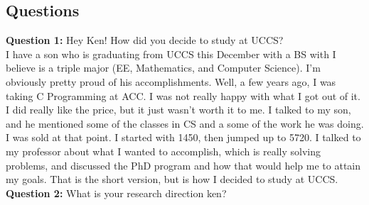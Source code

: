 \subsection{Questions}
\textbf{Question 1:} Hey Ken! How did you decide to study at UCCS?\\
I have a son who is graduating from UCCS this December with a BS with I believe is a triple major (EE, Mathematics, and Computer Science).  I'm obviously pretty proud of his accomplishments.  Well, a few years ago, I was taking C Programming at ACC.  I was not really happy with what I got out of it.  I did really like the price, but it just wasn't worth it to me.  I talked to my son, and he mentioned some of the classes in CS and a some of the work he was doing.  I was sold at that point.  I started with 1450, then jumped up to 5720.  I talked to my professor about what I wanted to accomplish, which is really solving problems, and discussed the PhD program and how that would help me to attain my goals.  That is the short version, but is how I decided to study at UCCS.\\

\textbf{Question 2:}
What is your research direction ken?